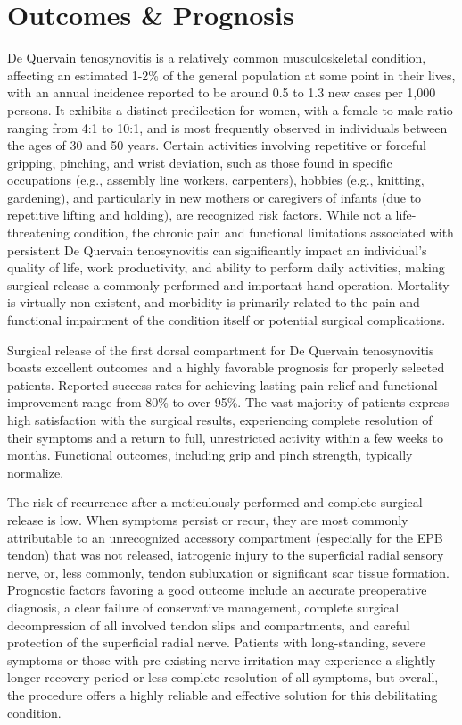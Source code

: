 \section*{Outcomes \& Prognosis}
De Quervain tenosynovitis is a relatively common musculoskeletal condition, affecting an estimated 1-2\% of the general population at some point in their lives, with an annual incidence reported to be around 0.5 to 1.3 new cases per 1,000 persons. It exhibits a distinct predilection for women, with a female-to-male ratio ranging from 4:1 to 10:1, and is most frequently observed in individuals between the ages of 30 and 50 years. Certain activities involving repetitive or forceful gripping, pinching, and wrist deviation, such as those found in specific occupations (e.g., assembly line workers, carpenters), hobbies (e.g., knitting, gardening), and particularly in new mothers or caregivers of infants (due to repetitive lifting and holding), are recognized risk factors. While not a life-threatening condition, the chronic pain and functional limitations associated with persistent De Quervain tenosynovitis can significantly impact an individual's quality of life, work productivity, and ability to perform daily activities, making surgical release a commonly performed and important hand operation. Mortality is virtually non-existent, and morbidity is primarily related to the pain and functional impairment of the condition itself or potential surgical complications.

Surgical release of the first dorsal compartment for De Quervain tenosynovitis boasts excellent outcomes and a highly favorable prognosis for properly selected patients. Reported success rates for achieving lasting pain relief and functional improvement range from 80\% to over 95\%. The vast majority of patients express high satisfaction with the surgical results, experiencing complete resolution of their symptoms and a return to full, unrestricted activity within a few weeks to months. Functional outcomes, including grip and pinch strength, typically normalize.

The risk of recurrence after a meticulously performed and complete surgical release is low. When symptoms persist or recur, they are most commonly attributable to an unrecognized accessory compartment (especially for the EPB tendon) that was not released, iatrogenic injury to the superficial radial sensory nerve, or, less commonly, tendon subluxation or significant scar tissue formation. Prognostic factors favoring a good outcome include an accurate preoperative diagnosis, a clear failure of conservative management, complete surgical decompression of all involved tendon slips and compartments, and careful protection of the superficial radial nerve. Patients with long-standing, severe symptoms or those with pre-existing nerve irritation may experience a slightly longer recovery period or less complete resolution of all symptoms, but overall, the procedure offers a highly reliable and effective solution for this debilitating condition.


